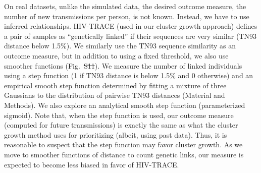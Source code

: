 \documentclass[a4paper,11pt]{article}
\newcommand{\PLWH}{sample\xspace}
\providecommand{\DIFadd}[1]{{\protect\color{blue}\uwave{#1}}} %
\providecommand{\DIFdel}[1]{{\protect\color{red}\sout{#1}}}                      %
\providecommand{\DIFaddbegin}{} %
\providecommand{\DIFaddend}{} %
\providecommand{\DIFdelbegin}{} %
\providecommand{\DIFdelend}{} %
\begin{document}

On real datasets, unlike the simulated data, the desired outcome measure, the number of new transmissions per person, is not known. 
Instead, we have to use inferred relationships.
HIV-TRACE (used in our cluster growth approach) defines
a pair of \PLWH{s} as ``genetically linked''
if their sequences are very similar (TN93 distance below 1.5\%).
We similarly use the TN93 sequence similarity as an outcome measure, but in addition to using a fixed threshold, we also use smoother functions (Fig.~\DIFdelbegin \DIFdel{S11}\DIFdelend \DIFaddbegin \DIFadd{S13}\DIFaddend ).
We measure the number of linked individuals using a step function (1 if TN93 distance is below 1.5\% and 0 otherwise) 
and an empirical smooth step function determined by fitting a mixture of three Gaussians to the distribution of pairwise TN93 distances (Material and Methods).
We also explore an analytical smooth step function (parameterized sigmoid).  
Note that, when the step function is used, our outcome measure (computed for future transmissions) is exactly the same as what the cluster growth method uses for prioritizing (albeit, using past data). 
Thus, it is reasonable to suspect that the step function may favor cluster growth. 
As we move to smoother functions of distance to count genetic links, our measure is expected to become less biased in favor of HIV-TRACE. 
\end{document}
